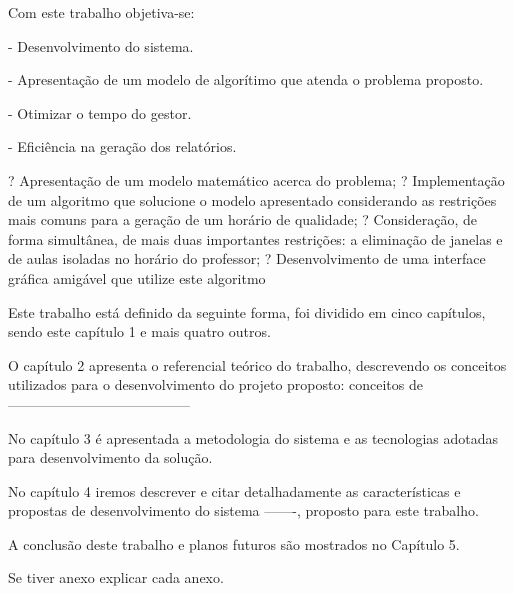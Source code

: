 Com este trabalho objetiva-se:\par

	- Desenvolvimento do sistema.\par
	- Apresentação de um modelo de algorítimo que atenda o problema proposto.\par
	- Otimizar o tempo do gestor.\par
	- Eficiência na geração dos relatórios.\par

	? Apresentação de um modelo matemático acerca do problema;
? Implementação de um algoritmo que solucione o modelo apresentado considerando
as restrições mais comuns para a geração de um horário de qualidade;
? Consideração, de forma simultânea, de mais duas importantes restrições: a
eliminação de janelas e de aulas isoladas no horário do professor;
? Desenvolvimento de uma interface gráfica amigável que utilize este algoritmo




Este trabalho está definido da seguinte forma, foi dividido em cinco capítulos, sendo este capítulo 1 e mais quatro outros.\par

O capítulo 2 apresenta o referencial teórico do trabalho, descrevendo os conceitos utilizados para o desenvolvimento do projeto proposto: conceitos de ---------------------------------------\par

No capítulo 3 é apresentada a metodologia do sistema e as tecnologias adotadas para desenvolvimento da solução.\par

No capítulo 4 iremos descrever e citar detalhadamente as características e propostas de desenvolvimento do sistema -------, proposto para este trabalho.\par

A conclusão deste trabalho e planos futuros são mostrados no Capítulo 5.\par

Se tiver anexo explicar cada anexo.

